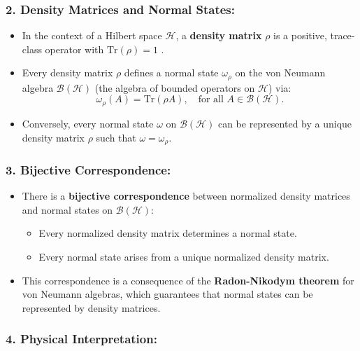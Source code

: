 \documentclass{article}
\begin{document}
\subsubsection*{2. \textbf{Density Matrices and Normal States}:}

\begin{itemize}
\item In the context of a Hilbert space $\mathcal{H}$, a \textbf{density
matrix} $\rho$ is a positive, trace-class operator with $\text{Tr}(\rho) = 1$%
. 

\item Every density matrix $\rho$ defines a normal state $\omega_\rho$ on
the von Neumann algebra $\mathcal{B}(\mathcal{H})$ (the algebra of bounded
operators on $\mathcal{H}$) via:  
\begin{equation*}
\omega_\rho(A) = \text{Tr}(\rho A), \quad \text{for all } A \in \mathcal{B}(%
\mathcal{H}).  
\end{equation*}

\item Conversely, every normal state $\omega$ on $\mathcal{B}(\mathcal{H})$
can be represented by a unique density matrix $\rho$ such that $\omega =
\omega_\rho$.
\end{itemize}

\subsubsection*{3. \textbf{Bijective Correspondence}:}

\begin{itemize}
\item There is a \textbf{bijective correspondence} between normalized
density matrices and normal states on $\mathcal{B}(\mathcal{H})$: 

\begin{itemize}
\item Every normalized density matrix determines a normal state. 

\item Every normal state arises from a unique normalized density matrix. 
\end{itemize}

\item This correspondence is a consequence of the \textbf{Radon-Nikodym
theorem} for von Neumann algebras, which guarantees that normal states can
be represented by density matrices.
\end{itemize}

\subsubsection*{4. \textbf{Physical Interpretation}:}
\end{document}
